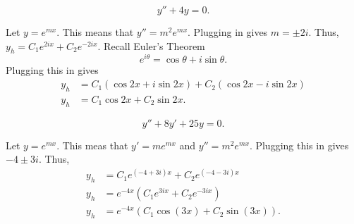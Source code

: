 \begin{example}
   $$ y''+4y = 0.$$
\end{example}
\begin{soln}
    Let $y=e^{mx}$. This means that $y'' = m^2e^{mx}$. Plugging in gives
    $m= \pm 2i$. Thus, $y_h = C_1e^{2ix} + C_2e^{-2ix}$. Recall 
    \alert{Euler's Theorem} $$e^{i\theta} = \cos \theta + i\sin \theta.$$
    Plugging this in gives
    \begin{align*}
        y_h &= C_1(\cos 2x + i\sin 2x) + C_2(\cos 2x  -i\sin  2x) \\
        y_h &= C_1\cos 2x + C_2 \sin 2x.
    \end{align*}
\end{soln}
\begin{example}
$$y''+8y'+25y = 0.$$
\end{example}
\begin{soln}
    Let $y=e^{mx}$. This meas that $y' = me^{mx}$ and $y'' = m^2e^{mx}$.
    Plugging this in gives $-4\pm 3i$. Thus, 
    \begin{align*}
        y_h &= C_1e^{(-4+3i)x} + C_2e^{(-4-3i)x} \\
        y_h &= e^{-4x}\left(C_1e^{3ix} + C_2e^{-3ix} \right) \\
        y_h &= e^{-4x}\left(C_1 \cos(3x) + C_2 \sin (3x) \right).
    \end{align*}
\end{soln}


